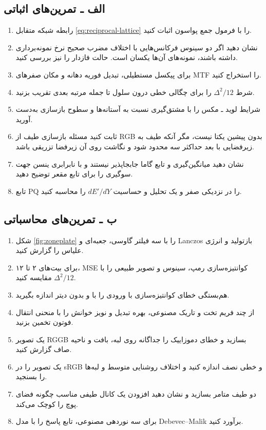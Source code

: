 \documentclass[12pt,openany,oneside]{book}
\begin{document}
\subsection*{الف ـ تمرین‌های اثباتی}
\begin{enumerate}
\item رابطه شبکه متقابل \eqref{eq:reciprocal-lattice} را با فرمول جمع پواسون اثبات کنید.
\item نشان دهید اگر دو سینوس فرکانس‌هایی با اختلاف مضرب صحیح نرخ نمونه‌برداری داشته باشند، نمونه‌های
آن‌ها یکسان است. حالت فازدار را نیز بررسی کنید.
\item برای پیکسل مستطیلی، تبدیل فوریه دهانه و مکان صفرهای MTF را استخراج کنید.
\item شرط \(\Delta^2/12\) را برای چگالی خطی درون سلول تا جمله مرتبه بعدی تقریب بزنید.
\item شرایط لوید ـ مکس را با مشتق‌گیری نسبت به آستانه‌ها و سطوح بازسازی به‌دست آورید.
\item ثابت کنید مسئله بازسازی طیف از RGB بدون پیشین یکتا نیست، مگر آنکه طیف به زیر‌فضایی با بعد حداکثر
سه محدود شود و نگاشت روی آن زیر‌فضا تزریقی باشد.
\item نشان دهید میانگین‌گیری و تابع گاما جابجاپذیر نیستند و با نابرابری ینسن جهت سوگیری را برای تابع
مقعر توضیح دهید.
\item تابع PQ را در نزدیکی صفر و یک تحلیل و حساسیت \(dE'/dY\) را محاسبه کنید.
\end{enumerate}

\subsection*{ب ـ تمرین‌های محاسباتی}
\begin{enumerate}
\item شکل \ref{fig:zoneplate} را با سه فیلتر گاوسی، جعبه‌ای و Lanczos بازتولید و انرژی علیاس را گزارش کنید.
\item برای بیت‌های ۲ تا ۱۲، MSE کوانتیزه‌سازی رمپ، سینوس و تصویر طبیعی را با \(\Delta^2/12\) مقایسه کنید.
\item هم‌بستگی خطای کوانتیزه‌سازی با ورودی را با و بدون دیتر اندازه بگیرید.
\item از چند فریم تخت و تاریک مصنوعی، بهره تبدیل و نویز خوانش را با منحنی انتقال فوتون تخمین بزنید.
\item یک تصویر RGGB بسازید و خطای دموزاییک را جداگانه روی لبه، بافت و ناحیه صاف گزارش کنید.
\item یک تصویر را در sRGB و خطی نصف اندازه کنید و اختلاف روشنایی متوسط و لبه‌ها را بسنجید.
\item دو طیف متامر بسازید و نشان دهید افزودن یک کانال طیفی مناسب چگونه فضای پوچ را کوچک می‌کند.
\item برای سه نوردهی مصنوعی، تابع پاسخ را با مدل Debevec--Malik برآورد کنید.
\end{enumerate}
\end{document}
